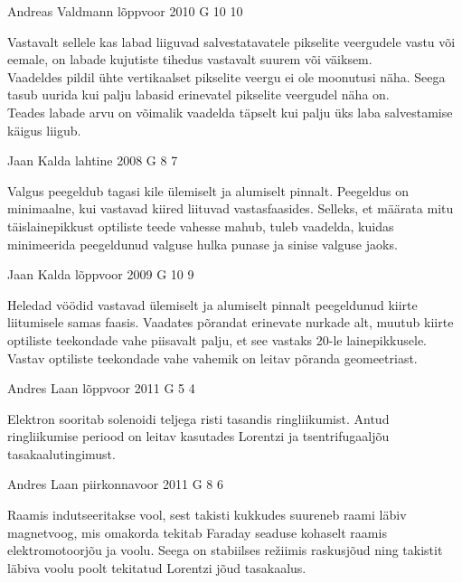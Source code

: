 \documentclass[11pt, twoside]{article}
\begin{document}
{%
{Andreas Valdmann} %
{lõppvoor} %
{2010} %
{G 10} %
{10} %
{

\ifHint
\osa
Vastavalt sellele kas labad liiguvad salvestatavatele pikselite veergudele vastu või eemale, on labade kujutiste tihedus vastavalt suurem või väiksem.\\
\osa
Vaadeldes pildil ühte vertikaalset pikselite veergu ei ole moonutusi näha. Seega tasub uurida kui palju labasid erinevatel pikselite veergudel näha on.\\
\osa
Teades labade arvu on võimalik vaadelda täpselt kui palju üks laba salvestamise käigus liigub.
\fi
}

{Jaan Kalda} %
{lahtine} %
{2008} %
{G 8} %
{7} %
{

\ifHint
Valgus peegeldub tagasi kile ülemiselt ja alumiselt pinnalt. Peegeldus on minimaalne, kui vastavad kiired liituvad vastasfaasides. Selleks, et määrata mitu täislainepikkust optiliste teede vahesse mahub, tuleb vaadelda, kuidas minimeerida peegeldunud valguse hulka punase ja sinise valguse jaoks. 
\fi
}

{Jaan Kalda} %
{lõppvoor} %
{2009} %
{G 10} %
{9} %
{

\ifHint
Heledad vöödid vastavad ülemiselt ja alumiselt pinnalt peegeldunud kiirte liitumisele samas faasis. Vaadates põrandat erinevate nurkade alt, muutub kiirte optiliste teekondade vahe piisavalt palju, et see vastaks \num{20}-le lainepikkusele. Vastav optiliste teekondade vahe vahemik on leitav põranda geomeetriast.
\fi
}

{Andres Laan} %
{lõppvoor} %
{2011} %
{G 5} %
{4} %
{

\ifHint
Elektron sooritab solenoidi teljega risti tasandis ringliikumist. Antud ringliikumise periood on leitav kasutades Lorentzi ja tsentrifugaaljõu tasakaalutingimust.
\fi
}

{Andres Laan} %
{piirkonnavoor} %
{2011} %
{G 8} %
{6} %
{

\ifHint
Raamis indutseeritakse vool, sest takisti kukkudes suureneb raami läbiv magnetvoog, mis omakorda tekitab Faraday seaduse kohaselt raamis elektromotoorjõu ja voolu. Seega on stabiilses režiimis raskusjõud ning takistit läbiva voolu poolt tekitatud Lorentzi jõud tasakaalus.
\fi
}

}
\end{document}
